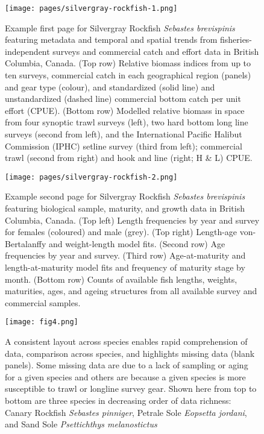 \documentclass[12pt,]{article}
\begin{document}
\begin{figure}[h]
\centering
\texttt{[image: pages/silvergray-rockfish-1.png]}
\caption{Example first page for Silvergray Rockfish \emph{Sebastes brevispinis} featuring metadata and temporal and spatial trends from fisheries-independent surveys and commercial catch and effort data in British Columbia, Canada. (Top row) Relative biomass indices from up to ten surveys, commercial catch in each geographical region (panels) and gear type (colour), and standardized (solid line) and unstandardized (dashed line) commercial bottom catch per unit effort (CPUE). (Bottom row) Modelled relative biomass in space from four synoptic trawl surveys (left), two hard bottom long line surveys (second from left), and the International Pacific Halibut Commission (IPHC) setline survey (third from left); commercial trawl (second from right) and hook and line (right; H \& L) CPUE.}
\label{fig:page1}
\end{figure}


\begin{figure}[h]
\centering
\texttt{[image: pages/silvergray-rockfish-2.png]}
\caption{ Example second page for Silvergray Rockfish \emph{Sebastes brevispinis} featuring biological sample, maturity, and growth data in British Columbia, Canada. (Top left) Length frequencies by year and survey for females (coloured) and male (grey). (Top right) Length-age von-Bertalanffy and weight-length model fits. (Second row) Age frequencies by year and survey. (Third row) Age-at-maturity and length-at-maturity model fits and frequency of maturity stage by month. (Bottom row) Counts of available fish lengths, weights, maturities, ages, and ageing structures from all available survey and commercial samples.}
\label{fig:page2}
\end{figure}

\begin{figure}[h]
\centering
\texttt{[image: fig4.png]}
\caption{A consistent layout across species enables rapid comprehension of data,
comparison across species, and highlights missing data (blank panels). Some
missing data are due to a lack of sampling or aging for a given species and
others are because a given species is more susceptible to trawl or longline
survey gear. Shown here from top to bottom are three species in decreasing order
of data richness: Canary Rockfish \emph{Sebastes
pinniger}, Petrale Sole \emph{Eopsetta jordani}, and Sand Sole
\emph{Psettichthys melanostictus}}
\label{fig:fig4}
\end{figure}
\end{document}

